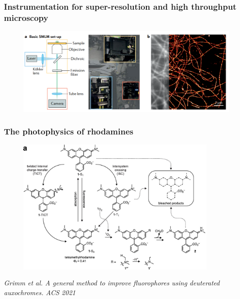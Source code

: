 \documentclass{beamer}					%
\begin{document}
\begin{frame}
\frametitle{Instrumentation for super-resolution and high throughput microscopy}

\begin{figure}
\includegraphics[width=12cm]{Setup.png}
\end{figure}
  
\end{frame}

\begin{frame}
\frametitle{The photophysics of rhodamines}

\begin{figure}
\includegraphics[width=10cm]{Rhodamines.png}
\end{figure}
\textit{Grimm et al. A general method to improve fluorophores using deuterated auxochromes. ACS 2021}
  
\end{frame}
\end{document}
